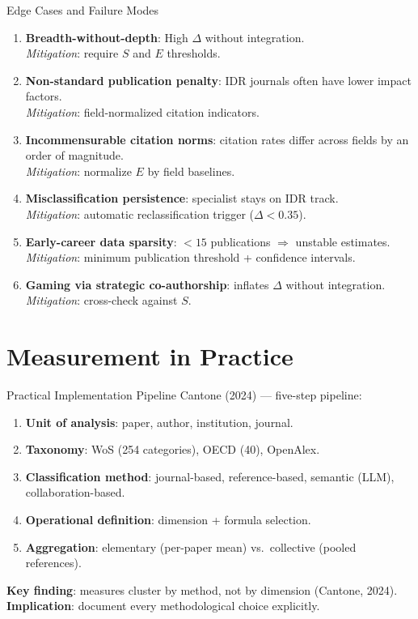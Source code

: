 \documentclass[aspectratio=169,10pt]{beamer}
\begin{document}
\begin{frame}{Edge Cases and Failure Modes}
\begin{enumerate}\small
  \item \textbf{Breadth-without-depth}: High $\Delta$ without integration.\\
        \emph{Mitigation}: require $S$ and $E$ thresholds.
  \item \textbf{Non-standard publication penalty}: IDR journals often have
        lower impact factors.\\
        \emph{Mitigation}: field-normalized citation indicators.
  \item \textbf{Incommensurable citation norms}: citation rates differ
        across fields by an order of magnitude.\\
        \emph{Mitigation}: normalize $E$ by field baselines.
  \item \textbf{Misclassification persistence}: specialist stays on IDR
        track.\\
        \emph{Mitigation}: automatic reclassification trigger ($\Delta < 0.35$).
  \item \textbf{Early-career data sparsity}: $< 15$ publications
        $\Rightarrow$ unstable estimates.\\
        \emph{Mitigation}: minimum publication threshold + confidence intervals.
  \item \textbf{Gaming via strategic co-authorship}: inflates $\Delta$
        without integration.\\
        \emph{Mitigation}: cross-check against $S$.
\end{enumerate}
\end{frame}

\section{Measurement in Practice}

\begin{frame}{Practical Implementation Pipeline}
Cantone (2024) --- five-step pipeline:
\begin{enumerate}
  \item \textbf{Unit of analysis}: paper, author, institution, journal.
  \item \textbf{Taxonomy}: WoS (254 categories), OECD (40), OpenAlex.
  \item \textbf{Classification method}: journal-based, reference-based,
        semantic (LLM), collaboration-based.
  \item \textbf{Operational definition}: dimension + formula selection.
  \item \textbf{Aggregation}: elementary (per-paper mean) vs.\
        collective (pooled references).
\end{enumerate}
\medskip
\textbf{Key finding}: measures cluster by method, not by dimension
(Cantone, 2024).\\
\textbf{Implication}: document every methodological choice explicitly.
\end{frame}
\end{document}
